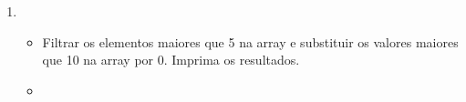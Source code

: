 \documentclass[letterpaper,10pt,english]{jupyterBook}
\begin{document}
\begin{enumerate}
\begin{itemize}
\item {} 
\sphinxAtStartPar
{}

\begin{sphinxVerbatim}[commandchars=\\\{\}]
  \PYG{p}{[}\PYG{p}{]}
\end{sphinxVerbatim}

\sphinxAtStartPar
{}

\begin{sphinxVerbatim}[commandchars=\\\{\}]
  
\end{sphinxVerbatim}

\item {} 
\sphinxAtStartPar
{}

\begin{sphinxVerbatim}[commandchars=\\\{\}]
  \PYG{p}{[}\PYG{p}{]}


\end{sphinxVerbatim}

\sphinxAtStartPar
{}

\begin{sphinxVerbatim}[commandchars=\\\{\}]
 
\PYG{p}{[}  \PYG{p}{]}
\end{sphinxVerbatim}

\end{itemize}

\item {} 
\sphinxAtStartPar
{}
\begin{itemize}
\item {} 
\sphinxAtStartPar
{} Filtrar os elementos maiores que 5 na array \sphinxcode{\sphinxupquote{{[}3, 8, 1, 6, 2{]}}} e substituir os valores maiores que 10 na array \sphinxcode{\sphinxupquote{{[}7, 15, 2, 11, 9{]}}} por 0. Imprima os resultados.

\item {} 
\sphinxAtStartPar
{}


\end{itemize}
\end{enumerate}
\end{document}
